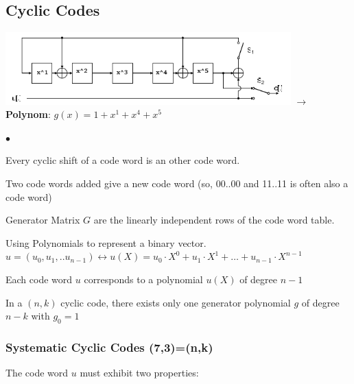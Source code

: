 \subsection{Cyclic Codes}
\includegraphics[width=11cm]{./bilder/shift_reg.png}
$\to$ \textbf{Polynom}: $g(x)=1+x^1+x^4+x^5$\\

\begin{list}{$\bullet$}{\setlength{\itemsep}{0cm} \setlength{\parsep}{0cm} \setlength{\topsep}{0.1cm}} 
\item Every cyclic shift of a code word is an other code word.
\item Two code words added give a new code word (so, 00..00 and 11..11 is often also a code word)
\item Generator Matrix $G$ are the linearly independent rows of the code word table.
\item Using Polynomials to represent a binary vector. \\
	  $u=(u_0, u_1,..u_{n-1}) \leftrightarrow u(X)=u_0 \cdot X^0 + u_1 \cdot X^1 + \ldots + u_{n-1} \cdot X^{n-1}$
\item Each code word $u$ corresponds to a polynomial $u(X)$ of degree $n-1$
\item In a $(n,k)$ cyclic code, there exists only one generator polynomial $g$ of degree $n-k$ with $g_0=1$
\end{list}

\subsubsection{Systematic Cyclic Codes (7,3)=(n,k)}
The code word $u$ must exhibit two properties:

